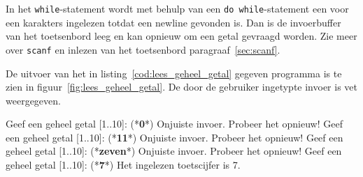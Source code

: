 In het \texttt{while}-statement wordt met behulp van een \texttt{do while}-statement een voor een karakters ingelezen totdat een newline gevonden is. Dan is de invoerbuffer van het toetsenbord leeg en kan opnieuw om een getal gevraagd worden. Zie meer over \texttt{scanf} en inlezen van het toetsenbord paragraaf~\ref{sec:scanf}.

De uitvoer van het in listing~\ref{cod:lees_geheel_getal} gegeven programma is te zien in figuur~\ref{fig:lees_geheel_getal}.
De door de gebruiker ingetypte invoer is vet weergegeven. 

\begin{dosbox}[title={Invoer en uitvoer van het programma.},label=fig:lees_geheel_getal]
Geef een geheel getal [1..10]: (*\textbf{0}*)
Onjuiste invoer. Probeer het opnieuw!
Geef een geheel getal [1..10]: (*\textbf{11}*)
Onjuiste invoer. Probeer het opnieuw!
Geef een geheel getal [1..10]: (*\textbf{zeven}*)
Onjuiste invoer. Probeer het opnieuw!
Geef een geheel getal [1..10]: (*\textbf{7}*)
Het ingelezen toetscijfer is 7.
\end{dosbox}



